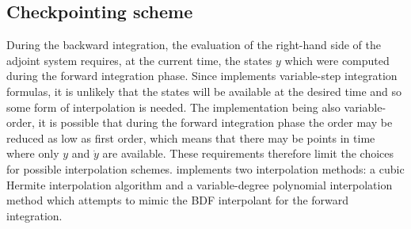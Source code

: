 \subsection{Checkpointing scheme}\label{ss:checkpointing}
During the backward integration, the evaluation of the right-hand side 
of the adjoint system requires, at the current time, the states $y$ which
were computed during the forward integration phase.
Since {\idas} implements variable-step integration formulas,
it is unlikely that the states will be available at the desired time and
so some form of interpolation is needed. The {\idas} implementation
being also variable-order, it is possible that during the forward
integration phase the order may be reduced as low as first order,
which means that there may be points in time where only $y$ and ${\dot y}$
are available. These requirements therefore limit the choices for possible
interpolation schemes.
{\idas} implements two interpolation methods: a cubic Hermite interpolation
algorithm and a variable-degree polynomial interpolation method which attempts 
to mimic the BDF interpolant for the forward integration.

